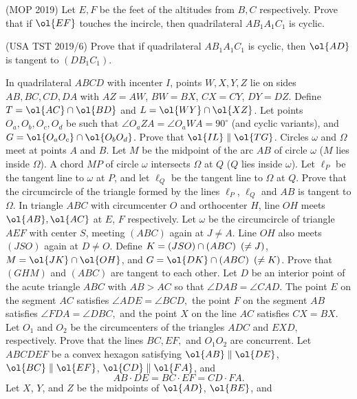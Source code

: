 \documentclass{seto}
\begin{document}
\begin{parts}
\item {\sffamily\maincolor(MOP 2019)} Let $E,F$ be the feet of the altitudes
from $B,C$ respectively. Prove that if $\ol{EF}$ touches the incircle, then
quadrilateral $AB_1A_1C_1$ is cyclic. 
\item {\sffamily\maincolor(USA TST 2019/6)} Prove that if quadrilateral
$AB_1A_1C_1$ is cyclic, then $\ol{AD}$ is tangent to $(DB_1C_1)$.
\end{parts}\vspace{-7pt}
\exercise[ELMO SL 2024/G4] In quadrilateral $ABCD$ with incenter $I$, 
points $W,X,Y,Z$ lie on sides $AB, BC,CD,DA$ with $AZ=AW$, $BW=BX$, $CX=CY$, $DY=DZ$. 
Define $T=\ol{AC}\cap\ol{BD}$ and $L=\ol{WY}\cap\ol{XZ}$. 
Let points $O_a,O_b,O_c,O_d$ be such that $\angle O_aZA=\angle O_aWA=90^\circ$ (and cyclic variants), 
and $G=\ol{O_aO_c}\cap\ol{O_bO_d}$. Prove that $\ol{IL}\parallel\ol{TG}$.
\exercise[APMO 2014/5] Circles $\omega$ and $\Omega$ meet at points $A$ and $B$.
Let $M$ be the midpoint of the arc $AB$ of circle $\omega$ ($M$ lies inside
$\Omega$). A chord $MP$ of circle $\omega$ intersects $\Omega$ at $Q$ ($Q$ lies
inside $\omega$). Let $\ell_P$ be the tangent line to $\omega$ at $P$, and let
$\ell_Q$ be the tangent line to $\Omega$ at $Q$. Prove that the circumcircle of
the triangle formed by the lines $\ell_P$, $\ell_Q$ and $AB$ is tangent to
$\Omega$.
\exercise[DeuX MO 2020/II/3] In triangle $ ABC$ with circumcenter $O$ and
orthocenter $H$, line $OH$ meets $\ol{AB},\ol{AC}$ at $E$, $F$ respectively. Let
$\omega$ be the circumcircle of triangle $AEF$ with center $S$, meeting $(ABC)$
again at $J \neq A$. Line $OH$ also meets $(JSO)$ again at $D \neq O$. Define
$K=(JSO)\cap(ABC)\enskip(\neq J)$, $M=\ol{JK}\cap\ol{OH}$, and
$G=\ol{DK}\cap(ABC)\enskip(\neq K)$. Prove that $(GHM)$ and $(ABC)$ are tangent
to each other.
\exercise[IMO 2021/3] Let $D$ be an interior point of the acute triangle $ABC$
with $AB > AC$ so that $\angle DAB = \angle CAD.$ The point $E$ on the segment
$AC$ satisfies $\angle ADE =\angle BCD,$ the point $F$ on the segment $AB$
satisfies $\angle FDA =\angle DBC,$ and the point $X$ on the line $AC$ satisfies
$CX = BX.$ Let $O_1$ and $O_2$ be the circumcenters of the triangles $ADC$ and
$EXD,$ respectively. Prove that the lines $BC, EF,$ and $O_1O_2$ are concurrent.
\exercise[USAMO 2021/6]Let $ABCDEF$ be a convex hexagon satisfying
$\ol{AB} \parallel \ol{DE}$, $\ol{BC} \parallel
\ol{EF}$, $\ol{CD} \parallel \ol{FA}$, and
\[ AB \cdot DE = BC \cdot EF = CD \cdot FA. \]
Let $X$, $Y$, and $Z$ be the midpoints of $\ol{AD}$, $\ol{BE}$, and
\end{document}
